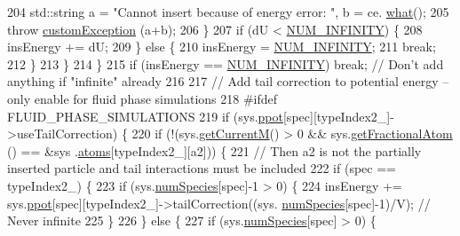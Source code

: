 \begin{DoxyCode}
204                         std::string a = \textcolor{stringliteral}{"Cannot insert because of energy error: "}, b = ce.
      \hyperlink{classcustom_exception_aeb6ab5848b038adfc68fde86a512f691}{what}();
205                         \textcolor{keywordflow}{throw} \hyperlink{classcustom_exception}{customException} (a+b);
206                     \}
207                     \textcolor{keywordflow}{if} (dU < \hyperlink{potentials_8h_ab94ab1d09e2291d03fe92a0e24a9d33b}{NUM\_INFINITY}) \{
208                         insEnergy += dU;
209                     \} \textcolor{keywordflow}{else} \{
210                         insEnergy = \hyperlink{potentials_8h_ab94ab1d09e2291d03fe92a0e24a9d33b}{NUM\_INFINITY};
211                         \textcolor{keywordflow}{break};
212                     \}
213                 \}
214             \}
215             \textcolor{keywordflow}{if} (insEnergy == \hyperlink{potentials_8h_ab94ab1d09e2291d03fe92a0e24a9d33b}{NUM\_INFINITY}) \textcolor{keywordflow}{break}; \textcolor{comment}{// Don't add anything if "infinite" already}
216 
217             \textcolor{comment}{// Add tail correction to potential energy -- only enable for fluid phase simulations}
218 \textcolor{preprocessor}{    #ifdef FLUID\_PHASE\_SIMULATIONS}
219 \textcolor{preprocessor}{}            \textcolor{keywordflow}{if} (sys.\hyperlink{classsim_system_ad2e290b5963f132e6a3a56cee35c8e9f}{ppot}[spec][typeIndex2\_]->useTailCorrection) \{
220                 \textcolor{keywordflow}{if} (!(sys.\hyperlink{classsim_system_a299fe4372e610b554eaaf5f5957b2dbc}{getCurrentM}() > 0 && sys.\hyperlink{classsim_system_a2ab77377c60e0e3109a6e875690b0ab7}{getFractionalAtom} () == &sys
      .\hyperlink{classsim_system_a90421b19082f7fb8fc23b7264b1161e4}{atoms}[typeIndex2\_][a2])) \{
221                     \textcolor{comment}{// Then a2 is not the partially inserted particle and tail interactions must be
       included}
222                     \textcolor{keywordflow}{if} (spec == typeIndex2\_) \{
223                         \textcolor{keywordflow}{if} (sys.\hyperlink{classsim_system_a9eea865e6dc1cff377b1e79c4d9c23f0}{numSpecies}[spec]-1 > 0) \{
224                             insEnergy += sys.\hyperlink{classsim_system_ad2e290b5963f132e6a3a56cee35c8e9f}{ppot}[spec][typeIndex2\_]->tailCorrection((sys.
      \hyperlink{classsim_system_a9eea865e6dc1cff377b1e79c4d9c23f0}{numSpecies}[spec]-1)/V); \textcolor{comment}{// Never infinite}
225                         \}
226                     \} \textcolor{keywordflow}{else} \{
227                         \textcolor{keywordflow}{if} (sys.\hyperlink{classsim_system_a9eea865e6dc1cff377b1e79c4d9c23f0}{numSpecies}[spec] > 0) \{

\end{DoxyCode}

